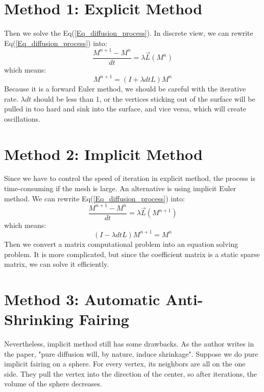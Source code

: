 \documentclass[tog]{acmsiggraph}
\begin{document}
\section{Method 1: Explicit Method}

Then we solve the Eq(\ref{Eq_diffusion_process}). In discrete view, we can rewrite Eq(\ref{Eq_diffusion_process}) into:
\begin{equation}
	\frac{M^{n+1} - M^n}{dt} = \lambda \vec{L}(M^n)
\end{equation}
which means:
\begin{equation}
	M^{n+1} = (I + \lambda dt L) M^n
\end{equation}
Because it is a forward Euler method, we should be careful with the iterative rate. $\lambda dt$ should be less than 1, or the vertices sticking out of the surface will be pulled in too hard and sink into the surface, and vice versa, which will create oscillations.


\section{Method 2: Implicit Method}

Since we have to control the speed of iteration in explicit method, the process is time-consuming if the mesh is large. An alternative is using implicit Euler method. We can rewrite Eq(\ref{Eq_diffusion_process}) into:
\begin{equation}
	\frac{M^{n+1} - M^n}{dt} = \lambda \vec{L}(M^{n+1})
\end{equation}
which means:
\begin{equation}
	(I - \lambda dt L) M^{n+1} =  M^n
\end{equation}
Then we convert a matrix computational problem into an equation solving problem. It is more complicated, but since the coefficient matrix is a static sparse matrix, we can solve it efficiently.


\section{Method 3: Automatic Anti-Shrinking Fairing}

Nevertheless, implicit method still has some drawbacks. As the author writes in the paper, "pure diffusion will, by nature, induce shrinkage". Suppose we do pure implicit fairing on a sphere. For every vertex, its neighbors are all on the one side. They pull the vertex into the direction of the center, so after iterations, the volume of the sphere decreases.
\end{document}
